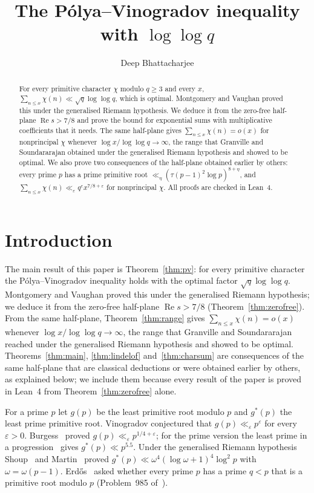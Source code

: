 \documentclass[12pt]{amsart}
\title{The P\'olya--Vinogradov inequality with $\log\log q$}
\author{Deep Bhattacharjee}
\theoremstyle{remark}
\renewcommand{\Re}{\operatorname{Re}}
\begin{document}
\begin{abstract}
For every primitive character $\chi$ modulo $q\ge3$ and every $x$,
$\sum_{n\le x}\chi(n)\ll\sqrt q\log\log q$, which is optimal. Montgomery and Vaughan
proved this under the generalised Riemann hypothesis. We deduce it from the zero-free half-plane
$\Re s>7/8$ and prove the bound for exponential sums with multiplicative coefficients that it
needs. The same half-plane gives $\sum_{n\le x}\chi(n)=o(x)$ for nonprincipal $\chi$ whenever
$\log x/\log\log q\to\infty$, the range that Granville and Soundararajan obtained under the
generalised Riemann hypothesis and showed to be optimal. We also prove two consequences of the half-plane obtained earlier by others: every prime
$p$ has a prime primitive root $\ll_\eta(\tau(p-1)^2\log p)^{8+\eta}$, and
$\sum_{n\le x}\chi(n)\ll_\varepsilon q^\varepsilon x^{7/8+\varepsilon}$ for nonprincipal $\chi$.
All proofs are checked in Lean~4.
\end{abstract}

\maketitle

\section{Introduction}

The main result of this paper is Theorem~\ref{thm:pv}: for every primitive character the
P\'olya--Vinogradov inequality holds with the optimal factor $\sqrt q\log\log q$. Montgomery and
Vaughan proved this under the generalised Riemann hypothesis; we deduce it from the zero-free
half-plane $\Re s>7/8$ (Theorem~\ref{thm:zerofree}). From the same half-plane,
Theorem~\ref{thm:range} gives $\sum_{n\le x}\chi(n)=o(x)$ whenever $\log x/\log\log q\to\infty$,
the range that Granville and Soundararajan reached under the generalised Riemann hypothesis and
showed to be optimal. Theorems~\ref{thm:main},
\ref{thm:lindelof} and~\ref{thm:charsum} are consequences of the same half-plane that are
classical deductions or were obtained earlier by others, as explained below; we include them
because every result of the paper is proved in Lean~4 from Theorem~\ref{thm:zerofree} alone.

For a prime $p$ let $g(p)$ be the least primitive root modulo $p$ and $g^*(p)$ the least prime
primitive root. Vinogradov conjectured that $g(p)\ll_\varepsilon p^\varepsilon$ for every
$\varepsilon>0$. Burgess~\cite{Bur62} proved $g(p)\ll_\varepsilon p^{1/4+\varepsilon}$; for the
prime version the least prime in a progression~\cite{HB92} gives $g^*(p)\ll p^{5.5}$. Under the
generalised Riemann hypothesis Shoup~\cite{Sho92} and Martin~\cite{Mar97} proved
$g^*(p)\ll\omega^4(\log\omega+1)^4\log^2p$ with $\omega=\omega(p-1)$. Erd\H{o}s~\cite{Erd65}
asked whether every prime $p$ has a prime $q<p$ that is a primitive root modulo $p$
(Problem~985 of~\cite{Blo}).
\end{document}
